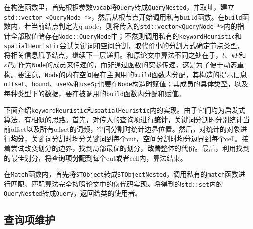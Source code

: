 \documentclass[UTF8]{ctexart}
\begin{document}
在构造函数里，首先根据参数\texttt{vocab}将\texttt{Query}转成\texttt{QueryNested}，并取址，建立\texttt{std::vector <QueryNode *>}，然后从根节点开始调用私有\texttt{build}函数。在\texttt{build}函数内，若当前结点判定为q-node，则将传入的\texttt{std::vector<QueryNode *>}内的指针全部取值储存在\texttt{Node::QueryNode}中；不然则调用私有的\texttt{keywordHeuristic}和\texttt{spatialHeuristic}尝试关键词和空间分割，取代价小的分割方式确定节点类型，将相关信息赋予结点，继续下一层递归。和原论文中算法不同之处在于，$l$、$kP$和$sP$是作为\texttt{Node}的成员来传递的，而非通过函数的实参传递，这是为了便于动态重构。要注意，\texttt{Node}的内存空间要在主调用的\texttt{build}函数内分配，其构造的提示信息\texttt{offset}、\texttt{bound}、\texttt{useKw}和\texttt{useSp}也要在\texttt{Node}构造时赋值；其成员的具体类型，以及每种类型下的数据，要在被调用的\texttt{build}函数内分配和赋值。

下面介绍\texttt{keywordHeuristic}和\texttt{spatialHeuristic}内的实现。由于它们均为启发式算法，有相似的思路。首先，对传入的查询项进行\textbf{统计}，关键词分割时分别统计当前offset以及所有offset的词频，空间分割时统计边界位置。然后，对统计的对象进行\textbf{均分}，关键词分割时均分关键词到每个cut，空间分割时均分边界到每个cell。接着尝试改变划分的边界，找到局部最优的划分，\textbf{改善}整体的代价。最后，利用找到的最佳划分，将查询项\textbf{分配}到每个cut或者cell内，算法结束。

在\texttt{Match}函数内，首先将\texttt{STObject}转成\texttt{STObjectNested}，调用私有的\texttt{match}函数进行匹配，匹配算法完全按照论文中的伪代码实现。将得到的\texttt{std::set}内的\texttt{QueryNested}转成\texttt{Query}，返回给类的使用者。

\subsection{查询项维护}
\end{document}
